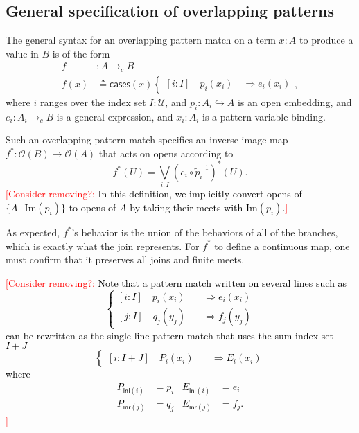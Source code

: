 \documentclass[conference]{IEEEtran}
\newcommand{\hookto}{\hookrightarrow}
\newcommand{\cto}{\to_c}
\newcommand{\Type}{\mathcal{U}}
\newcommand{\suchthat}{\ |\ }
\newcommand{\Open}[1]{\mathcal{O}({#1})}
\newcommand{\Img}[1]{\text{Im}\left({#1}\right)}
\newcommand{\Branch}{\Rightarrow}
\newcommand{\iimg}[1]{{#1}^*}
\newcommand{\ConsiderRemoving}[1]{\textcolor{red}{[Consider removing?: \textcolor{black}{#1}]}}
\begin{document}
\subsection{General specification of overlapping patterns}
The general syntax for an overlapping pattern match on a term $x : A$ to produce a value in $B$ is of the form
\begin{align*}
f &: A \cto B
\\ f(x) &\triangleq \mathsf{cases}(x)
\begin{cases}
[i : I] \quad p_i(x_i) \quad \Branch e_i(x_i)
\end{cases},
\end{align*}
where $i$ ranges over the index set $I : \Type$, and $p_i : A_i \hookto A$ is an open embedding, and $e_i : A_i \cto B$ is a general expression, and $x_i : A_i$ is a pattern variable binding.

Such an overlapping pattern match specifies an inverse image map $\iimg{f} : \Open{B} \to \Open{A}$ that acts on opens according to
\[
\iimg{f}(U) = \bigvee_{i : I} \iimg{(e_i \circ \tilde{p}_i^{-1})}(U).
\]
\ConsiderRemoving{In this definition, we implicitly convert opens of $\{ A \suchthat \Img{p_i} \}$ to opens of $A$ by taking their meets with $\Img{p_i}$.}

As expected, $\iimg{f}$'s behavior is the union of the behaviors of all of the branches, which is exactly what the join represents. For $\iimg{f}$ to define a continuous map, one must confirm that it preserves all joins and finite meets.

\ConsiderRemoving{Note that a pattern match written on several lines such as
\[
\begin{cases}
[i : I] \quad p_i(x_i) \quad &\Branch e_i(x_i)
\\ [j : I] \quad q_j(y_j) \quad &\Branch f_j(y_j)
\end{cases}
\]
can be rewritten as the single-line pattern match that uses the sum index set $I + J$
\[
\begin{cases}
[i : I + J] \quad P_i(x_i) \quad &\Branch E_i(x_i)
\end{cases}
\]
where
\begin{align*}
P_{\mathsf{inl}(i)} &= p_i
& E_{\mathsf{inl}(i)} &= e_i
\\ P_{\mathsf{inr}(j)} &= q_j
& E_{\mathsf{inr}(j)} &= f_j.
\end{align*}
}
\end{document}
